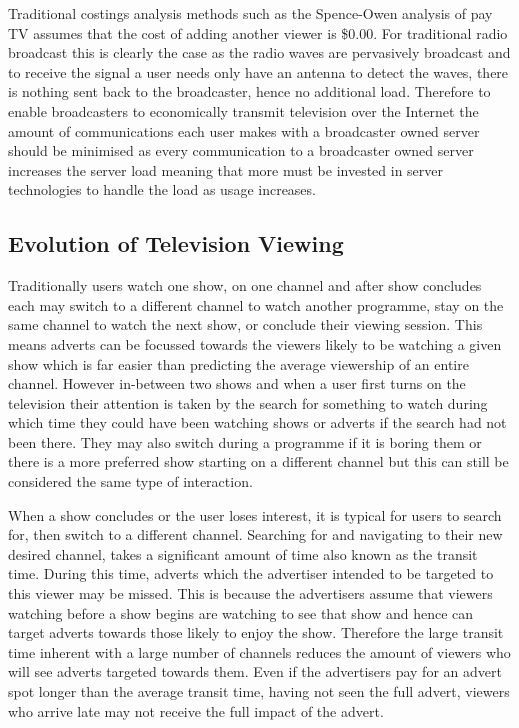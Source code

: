 	Traditional costings analysis methods such as the Spence-Owen analysis of pay TV assumes that the cost of adding another viewer is \$0.00\citet{broadcastEconomics}. For traditional radio broadcast this is clearly the case as the radio waves are pervasively broadcast and to receive the signal a user needs only have an antenna to detect the waves, there is nothing sent back to the broadcaster, hence no additional load. Therefore to enable broadcasters to economically transmit television over the Internet the amount of communications each user makes with a broadcaster owned server should be minimised as every communication to a broadcaster owned server increases the server load meaning that more must be invested in server technologies to handle the load as usage increases.

\subsection{Evolution of Television Viewing}
	Traditionally users watch one show, on one channel and after show concludes each may switch to a different channel to watch another programme, stay on the same channel to watch the next show, or conclude their viewing session. This means adverts can be focussed towards the viewers likely to be watching a given show which is far easier than predicting the average viewership of an entire channel. However in-between two shows and when a user first turns on the television their attention is taken by the search for something to watch during which time they could have been watching shows or adverts if the search had not been there. They may also switch during a programme if it is boring them or there is a more preferred show starting on a different channel but this can still be considered the same type of interaction.

	When a show concludes or the user loses interest, it is typical for users to search for, then switch to a different channel. Searching for and navigating to their new desired channel, takes a significant amount of time also known as the transit time. During this time, adverts which the advertiser intended to be targeted to this viewer may be missed. This is because the advertisers assume that viewers watching before a show begins are watching to see that show and hence can target adverts towards those likely to enjoy the show. Therefore the large transit time inherent with a large number of channels reduces the amount of viewers who will see adverts targeted towards them. Even if the advertisers pay for an advert spot longer than the average transit time, having not seen the full advert, viewers who arrive late may not receive the full impact of the advert.

